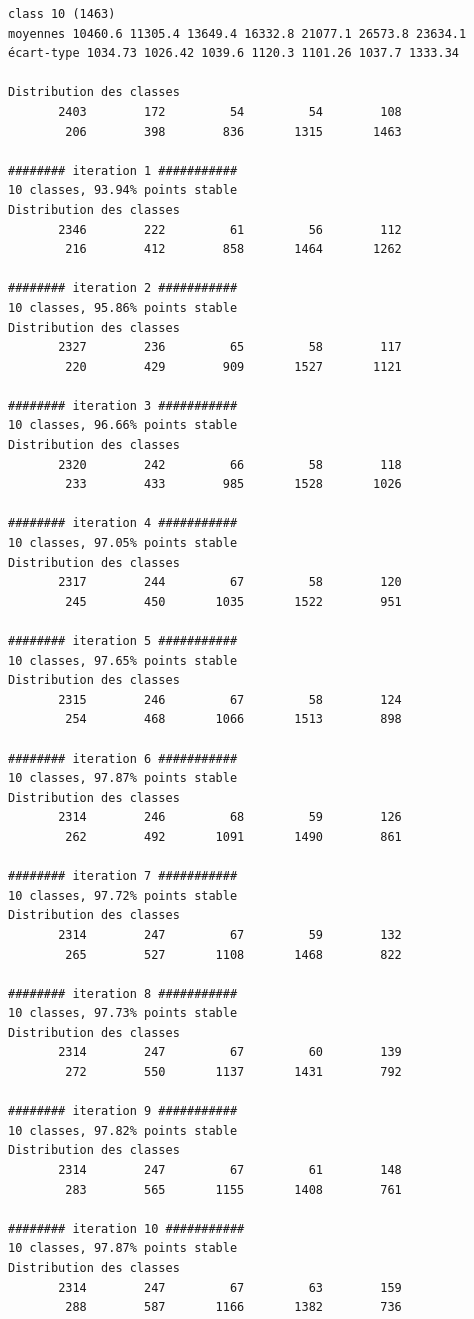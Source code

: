 \documentclass[earth,article,accept,pdftex,moreauthors]{Definitions/mdpi}
\begin{document}
{\begin{scriptsize}
\begin{verbatim}
class 10 (1463)
moyennes 10460.6 11305.4 13649.4 16332.8 21077.1 26573.8 23634.1
écart-type 1034.73 1026.42 1039.6 1120.3 1101.26 1037.7 1333.34

Distribution des classes
       2403        172         54         54        108
        206        398        836       1315       1463

######## iteration 1 ###########
10 classes, 93.94% points stable
Distribution des classes
       2346        222         61         56        112
        216        412        858       1464       1262

######## iteration 2 ###########
10 classes, 95.86% points stable
Distribution des classes
       2327        236         65         58        117
        220        429        909       1527       1121

######## iteration 3 ###########
10 classes, 96.66% points stable
Distribution des classes
       2320        242         66         58        118
        233        433        985       1528       1026

######## iteration 4 ###########
10 classes, 97.05% points stable
Distribution des classes
       2317        244         67         58        120
        245        450       1035       1522        951

######## iteration 5 ###########
10 classes, 97.65% points stable
Distribution des classes
       2315        246         67         58        124
        254        468       1066       1513        898

######## iteration 6 ###########
10 classes, 97.87% points stable
Distribution des classes
       2314        246         68         59        126
        262        492       1091       1490        861

######## iteration 7 ###########
10 classes, 97.72% points stable
Distribution des classes
       2314        247         67         59        132
        265        527       1108       1468        822

######## iteration 8 ###########
10 classes, 97.73% points stable
Distribution des classes
       2314        247         67         60        139
        272        550       1137       1431        792

######## iteration 9 ###########
10 classes, 97.82% points stable
Distribution des classes
       2314        247         67         61        148
        283        565       1155       1408        761

######## iteration 10 ###########
10 classes, 97.87% points stable
Distribution des classes
       2314        247         67         63        159
        288        587       1166       1382        736


\end{verbatim}
\end{scriptsize}}
\end{document}
